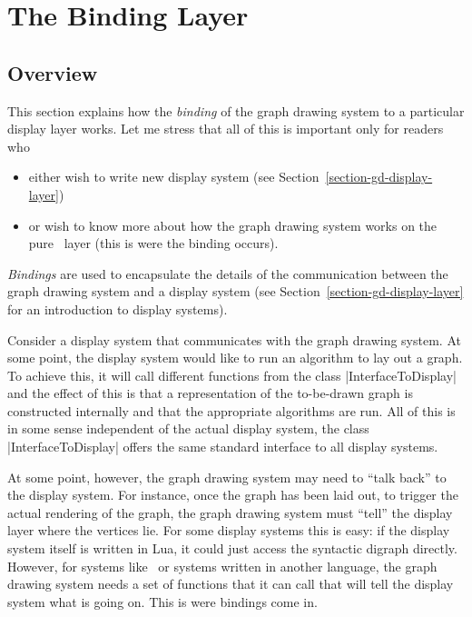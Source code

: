 %
%
%


\section{The Binding Layer}

\label{section-gd-binding-layer}


\subsection{Overview}

This section explains how the \emph{binding} of the graph drawing
system to a particular display layer works. Let me stress
that all of this is important only for readers who
\begin{itemize}
\item either wish to write new display system (see
  Section~\ref{section-gd-display-layer})
\item or wish to know more about how the graph drawing system works on
  the pure \pgfname\ layer (this is were the binding occurs). 
\end{itemize}

\emph{Bindings} are used to encapsulate the details of the
communication between the graph drawing system and a display system
(see Section~\ref{section-gd-display-layer} for an introduction to
display systems).

Consider a display system that communicates with the graph drawing
system. At some point, the display system would like to run an
algorithm to lay out a graph. To achieve this, it will call different
functions from the class |InterfaceToDisplay| and the effect of this
is that a representation of the to-be-drawn graph is constructed
internally and that the appropriate algorithms are run. All of this is
in some sense independent of the actual display system, the class
|InterfaceToDisplay| offers the same standard interface to all display
systems.

At some point, however, the graph drawing system may need to ``talk
back'' to the display system. For instance, once the graph has been
laid out, to trigger the actual rendering of the graph, the graph
drawing system must ``tell'' the display layer where the vertices
lie. For some display systems this is easy: if the display system
itself is written in Lua, it could just access the syntactic digraph
directly. However, for systems like \tikzname\ or systems written in
another language, the graph drawing system needs a set of functions
that it can call that will tell the display system what is going
on. This is were bindings come in.

